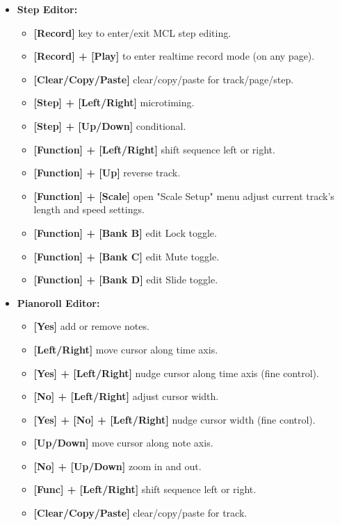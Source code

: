 \begin{itemize}
\item \textbf{Step Editor:}
\begin{itemize}
      \item \textbf{[Record]} key to enter/exit MCL step editing.
      \item \textbf{[Record] + [Play]} to enter realtime record mode (on any page).
      \item \textbf{[Clear/Copy/Paste]} clear/copy/paste for track/page/step.
      \item \textbf{[Step] + [Left/Right]} microtiming.
      \item \textbf{[Step] + [Up/Down]} conditional.
      \item \textbf{[Function] + [Left/Right]} shift sequence left or right.
      \item \textbf{[Function] + [Up]} reverse track.
      \item \textbf{[Function] + [Scale]} open "Scale Setup" menu adjust current track's length and speed settings.
      \item \textbf{[Function] + [Bank B]} edit Lock toggle.
      \item \textbf{[Function] + [Bank C]} edit Mute toggle.
      \item \textbf{[Function] + [Bank D]} edit Slide toggle.
\end{itemize}

\item \textbf{Pianoroll Editor:}
\begin{itemize}
     \item \textbf{[Yes]} add or remove notes.
     \item \textbf{[Left/Right]} move cursor along time axis.
     \item \textbf{[Yes] + [Left/Right]} nudge cursor along time axis (fine control).
     \item \textbf{[No] + [Left/Right]} adjust cursor width.
     \item \textbf{[Yes] + [No] + [Left/Right]} nudge cursor width (fine control).
     \item \textbf{[Up/Down]} move cursor along note axis.
     \item \textbf{[No] + [Up/Down]} zoom in and out.
     \item \textbf{[Func] + [Left/Right]} shift sequence left or right.
     \item \textbf{[Clear/Copy/Paste]} clear/copy/paste for track.
\end{itemize}


\end{itemize}



